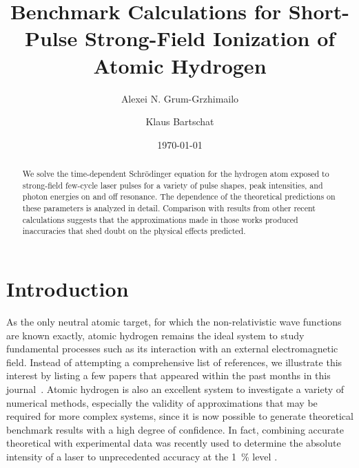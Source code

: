 \documentclass[aps,pra,amsmath,amssymb,showpacs,twocolumn,preprintnumbers,
floatfix,letterpaper]{revtex4-1}
\begin{document}

\author{Alexei N. Grum-Grzhimailo}

\author{Klaus Bartschat}

\date{\today}

\title{Benchmark Calculations for Short-Pulse Strong-Field Ionization of Atomic Hydrogen}

\begin{abstract}


We solve the time-dependent Schr\"odinger equation for the hydrogen atom exposed to strong-field few-cycle
laser pulses for a variety of pulse shapes, peak intensities, and photon energies on and off resonance.
The dependence of the theoretical predictions on these parameters is analyzed in detail.  Comparison
with results from other recent calculations suggests that the approximations made in those
works produced inaccuracies that shed doubt on the physical effects predicted. 
 
\end{abstract}


\maketitle

\section{Introduction}\label{sec:intro}
As the only neutral atomic target, for which the non-relativistic wave functions are known 
exactly, atomic hydrogen remains the ideal system to study fundamental processes such as 
its interaction with an external electromagnetic field.  Instead of attempting 
a comprehensive list of references, we illustrate this interest by listing a few papers
that appeared within the past months in this 
journal~\cite{PhysRevA.87.013405,PhysRevA.87.013421,PhysRevA.87.043405,PhysRevA.87.043411}. 
Atomic hydrogen is also an excellent system to investigate a variety of numerical methods, especially the
validity of approximations that may be required for more complex systems, since it is now possible
to generate theoretical benchmark results with a high degree of confidence. In fact,
combining accurate theoretical with experimental data was recently used to determine the
absolute intensity of a laser to unprecedented accuracy at the 1~\% level \cite{PhysRevA.87.053411}.
\end{document}
